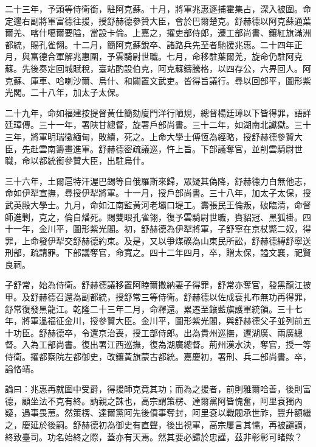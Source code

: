 \begin{pinyinscope}
二十三年，予頭等侍衛銜，駐阿克蘇。十月，將軍兆惠逐捕霍集占，深入被圍。命定邊右副將軍富德往援，授舒赫德參贊大臣，會於巴爾楚克。舒赫德以阿克蘇通葉爾羌、喀什噶爾要隘，當設卡倫。上嘉之，擢吏部侍郎，遷工部尚書、鑲紅旗滿洲都統，賜孔雀翎。十二月，簡阿克蘇銳卒、諸路兵先至者馳援兆惠。二十四年正月，與富德合軍解兆惠圍，予雲騎尉世職。七月，命移駐葉爾羌，旋命仍駐阿克蘇。先後奏定回城賦稅，臺站酌設伯克，阿克蘇鑄騰格，以四存公，六畀回人。阿克蘇、庫車、哈喇沙爾、烏什、和闐置文武吏。皆得旨議行。尋以回部平，圖形紫光閣。二十八年，加太子太保。

二十九年，命如福建按提督黃仕簡劾廈門洋行陋規，總督楊廷璋以下皆得罪，語詳廷璋傳。三十一年，署陜甘總督，旋署戶部尚書。三十二年，如湖南北讞獄。三十三年，將軍明瑞徵緬甸，敗績，死之。上命大學士傅恆為經略，授舒赫德參贊大臣，先赴雲南籌畫進軍。舒赫德密疏議巡，忤上旨。下部議奪官，並削雲騎尉世職，命以都統銜參贊大臣，出駐烏什。

三十六年，土爾扈特汗渥巴錫等自俄羅斯來歸，眾疑其偽降，舒赫德力白無他志，命如伊犁宣撫，尋授伊犁將軍。十一月，授戶部尚書。三十八年，加太子太保，授武英殿大學士。九月，命如江南監黃河老壩口堤工。壽張民王倫叛，破臨清，命督師進剿，克之，倫自燔死。賜雙眼孔雀翎，復予雲騎尉世職，賚貂冠、黑狐褂。四十一年，金川平，圖形紫光閣。初，舒赫德為伊犁將軍，子舒寧在京杖斃二奴，得罪，上命發伊犁交舒赫德約束。及是，又以爭煤礦為山東民所訟，舒赫德縛舒寧送刑部，疏請罪。下部議奪官，命寬之。四十二年四月，卒，贈太保，謚文襄，祀賢良祠。

子舒常，始為侍衛。舒赫德議移置阿睦爾撒納妻子得罪，舒常亦奪官，發黑龍江披甲。及舒赫德召還為副都統，授舒常三等侍衛。舒赫德以佐成袞扎布無功再得罪，舒常復發黑龍江。乾隆二十三年二月，命釋還。累遷至鑲藍旗護軍統領。三十七年，將軍溫福征金川，授參贊大臣。金川平，圖形紫光閣，與舒赫德父子並列前五十功臣。舒赫德卒，令還京治喪，授工部侍郎。出為貴州巡撫，遷湖廣、兩廣總督。入為工部尚書。復出署江西巡撫，復為湖廣總督。荊州漢水決，奪官，授一等侍衛。擢都察院左都御史，改鑲黃旗蒙古都統。嘉慶初，署刑、兵二部尚書。卒，謚恪靖。

論曰：兆惠再就圍中受爵，得援師克竟其功；而為之援者，前則雅爾哈善，後則富德，顧坐法不克有終。訥親之誅也，高宗謂策楞、達爾黨阿皆愧奮，阿里袞獨內疑，遇事畏葸。然策楞、達爾黨阿先後僨事奪封，阿里袞以戰閥承世祚，豐升額繼之，慶延於後嗣。舒赫德初為御史有直聲，後出視軍，高宗屢言其懦，再被譴謫，終致臺司。功名始終之際，蓋亦有天焉。然其要必歸於忠謹，茲非彰彰可睹歟？


\end{pinyinscope}